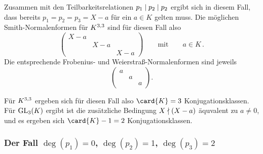 Zusammen mit den Teilbarkeitsrelationen $p_1 \divides p_2 \divides p_2$ ergibt sich in diesem Fall, dass bereits $p_1 = p_2 = p_3 = X - a$ für ein $a \in K$ gelten muss.
Die möglichen Smith-Normalenformen für $\matrices{3}{K}$ sind für diesen Fall also
\[
  \begin{pmatrix}
    X - a &       &       \\
          & X - a &       \\
          &       & X - a
  \end{pmatrix}
  \qquad\text{mit}\qquad
  a \in K \,.
\]
Die entsprechende Frobenius- und Weierstraß-Normalenformen sind jeweils
\[
  \begin{pmatrix}
    a &   &   \\
      & a &   \\
      &   & a
  \end{pmatrix}.
\]

Für $\matrices{3}{K}$ ergeben sich für diesen Fall also $\card{K} = 3$ Konjugationsklassen.
Für $\GL{3}{K}$ ergibt ist die zusätzliche Bedingung $X \notdivides (X - a)$ äquvalent zu $a \neq 0$, und es ergeben sich $\card{K} - 1 = 2$ Konjugationsklassen.



\subsubsection*{Der Fall $\deg(p_1) = 0$, $\deg(p_2) = 1$, $\deg(p_3) = 2$}

